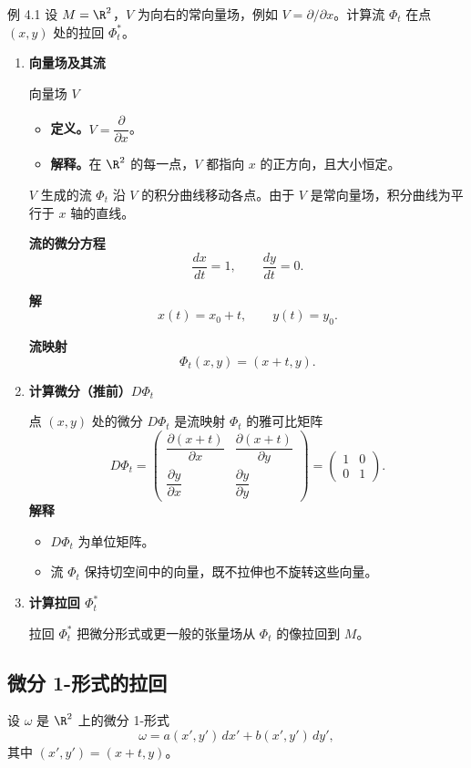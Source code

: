 \begin{statement}{例 4.1}{}
设 $M=\R^2$，$V$ 为向右的常向量场，例如 $V=\partial/\partial x$。计算流 $\Phi_t$ 在点 $(x,y)$ 处的拉回 $\Phi_t^*$。
\begin{enumerate}
  \item \textbf{向量场及其流}

  向量场 $V$
  \begin{itemize}
    \item \textbf{定义。}$V=\dfrac{\partial}{\partial x}$。
    \item \textbf{解释。}在 $\R^2$ 的每一点，$V$ 都指向 $x$ 的正方向，且大小恒定。
  \end{itemize}

  $V$ 生成的流 $\Phi_t$ 沿 $V$ 的积分曲线移动各点。由于 $V$ 是常向量场，积分曲线为平行于 $x$ 轴的直线。

  \textbf{流的微分方程}
  \[
    \frac{dx}{dt}=1,\qquad\frac{dy}{dt}=0.
  \]

  \textbf{解}
  \[
    x(t)=x_0+t,\qquad y(t)=y_0.
  \]

  \textbf{流映射}
  \[
    \Phi_t(x,y)=(x+t,y).
  \]

  \item \textbf{计算微分（推前）$D\Phi_t$}

  点 $(x,y)$ 处的微分 $D\Phi_t$ 是流映射 $\Phi_t$ 的雅可比矩阵
  \[
    D\Phi_t=\begin{pmatrix}
      \dfrac{\partial(x+t)}{\partial x}&\dfrac{\partial(x+t)}{\partial y}\\[5pt]
      \dfrac{\partial y}{\partial x}&\dfrac{\partial y}{\partial y}
    \end{pmatrix}
    =\begin{pmatrix}1&0\\0&1\end{pmatrix}.
  \]
  \textbf{解释}
  \begin{itemize}
    \item $D\Phi_t$ 为单位矩阵。
    \item 流 $\Phi_t$ 保持切空间中的向量，既不拉伸也不旋转这些向量。
  \end{itemize}
  \item \textbf{计算拉回 $\Phi_t^*$}

  拉回 $\Phi_t^*$ 把微分形式或更一般的张量场从 $\Phi_t$ 的像拉回到 $M$。
\end{enumerate}
\end{statement}

\subsection{微分 1-形式的拉回}
设 $\omega$ 是 $\R^2$ 上的微分 1-形式
\[
  \omega=a(x',y')\,dx'+b(x',y')\,dy',
\]
其中 $(x',y')=(x+t,y)$。

